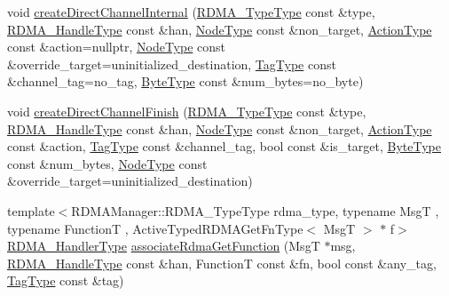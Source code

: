 \begin{DoxyCompactItemize}
\item 
void \hyperlink{structvt_1_1rdma_1_1_r_d_m_a_manager_ab512ce0c45479a8544e8a1eb6b2ed88a}{create\+Direct\+Channel\+Internal} (\hyperlink{namespacevt_1_1rdma_ac848e1d9da43db6294bd06f83e5d3946}{R\+D\+M\+A\+\_\+\+Type\+Type} const \&type, \hyperlink{namespacevt_a10442579ec4e7ebef223818e64bcf908}{R\+D\+M\+A\+\_\+\+Handle\+Type} const \&han, \hyperlink{namespacevt_a866da9d0efc19c0a1ce79e9e492f47e2}{Node\+Type} const \&non\+\_\+target, \hyperlink{namespacevt_ae0a5a7b18cc99d7b732cb4d44f46b0f3}{Action\+Type} const \&action=nullptr, \hyperlink{namespacevt_a866da9d0efc19c0a1ce79e9e492f47e2}{Node\+Type} const \&override\+\_\+target=uninitialized\+\_\+destination, \hyperlink{namespacevt_a84ab281dae04a52a4b243d6bf62d0e52}{Tag\+Type} const \&channel\+\_\+tag=no\+\_\+tag, \hyperlink{namespacevt_aab8d55968084610ce3b17057981e9300}{Byte\+Type} const \&num\+\_\+bytes=no\+\_\+byte)
\item 
void \hyperlink{structvt_1_1rdma_1_1_r_d_m_a_manager_a3b0d77f20a7c6395fd239b3579056798}{create\+Direct\+Channel\+Finish} (\hyperlink{namespacevt_1_1rdma_ac848e1d9da43db6294bd06f83e5d3946}{R\+D\+M\+A\+\_\+\+Type\+Type} const \&type, \hyperlink{namespacevt_a10442579ec4e7ebef223818e64bcf908}{R\+D\+M\+A\+\_\+\+Handle\+Type} const \&han, \hyperlink{namespacevt_a866da9d0efc19c0a1ce79e9e492f47e2}{Node\+Type} const \&non\+\_\+target, \hyperlink{namespacevt_ae0a5a7b18cc99d7b732cb4d44f46b0f3}{Action\+Type} const \&action, \hyperlink{namespacevt_a84ab281dae04a52a4b243d6bf62d0e52}{Tag\+Type} const \&channel\+\_\+tag, bool const \&is\+\_\+target, \hyperlink{namespacevt_aab8d55968084610ce3b17057981e9300}{Byte\+Type} const \&num\+\_\+bytes, \hyperlink{namespacevt_a866da9d0efc19c0a1ce79e9e492f47e2}{Node\+Type} const \&override\+\_\+target=uninitialized\+\_\+destination)
\item 
{\footnotesize template$<$R\+D\+M\+A\+Manager\+::\+R\+D\+M\+A\+\_\+\+Type\+Type rdma\+\_\+type, typename MsgT , typename FunctionT , Active\+Typed\+R\+D\+M\+A\+Get\+Fn\+Type$<$ Msg\+T $>$ $\ast$ f$>$ }\\\hyperlink{namespacevt_a9530efb893c0f3846e8ac5f0507e0f49}{R\+D\+M\+A\+\_\+\+Handler\+Type} \hyperlink{structvt_1_1rdma_1_1_r_d_m_a_manager_ab5737cb6eab4f266c495db156907b24c}{associate\+Rdma\+Get\+Function} (MsgT $\ast$msg, \hyperlink{namespacevt_a10442579ec4e7ebef223818e64bcf908}{R\+D\+M\+A\+\_\+\+Handle\+Type} const \&han, FunctionT const \&fn, bool const \&any\+\_\+tag, \hyperlink{namespacevt_a84ab281dae04a52a4b243d6bf62d0e52}{Tag\+Type} const \&tag)
\item 

\end{DoxyCompactItemize}

